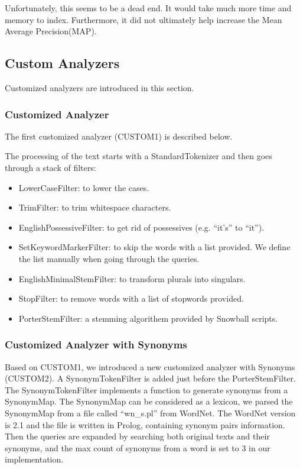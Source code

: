 Unfortunately, this seems to be a dead end. It would take much more time and memory to index. Furthermore, it did not ultimately help increase the Mean Average Precision(MAP).

\subsection{Custom Analyzers}

Customized analyzers are introduced in this section.

\subsubsection{Customized Analyzer}\hfill
\newline
The first customized analyzer (CUSTOM1) is described below.

The processing of the text starts with a StandardTokenizer and then goes through a stack of filters:

\begin{itemize}
    \item LowerCaseFilter: to lower the cases.
    \item TrimFilter: to trim whitespace characters.
    \item EnglishPossessiveFilter: to get rid of possessives (e.g. “it's” to “it”).
    \item SetKeywordMarkerFilter: to skip the words with a list provided. We define the list manually when going through the queries.
    \item EnglishMinimalStemFilter: to transform plurals into singulars.
    \item StopFilter: to remove words with a list of stopwords provided.
    \item PorterStemFilter: a stemming algorithem provided by Snowball scripts\cite{porterStemmer}.
\end{itemize}

\subsubsection{Customized Analyzer with Synonyms}\hfill
\newline
Based on CUSTOM1, we introduced a new customized analyzer with Synonyms (CUSTOM2). A SynonymTokenFilter is added just before the PorterStemFilter. The SynonymTokenFilter implements a function to generate synonyms from a SynonymMap. The SynonymMap can be considered as a lexicon, we parsed the SynonymMap from a file called “wn\_s.pl” from WordNet\cite{wordnet}. The WordNet version is 2.1 and the file is written in Prolog, containing synonym pairs information. Then the queries are expanded by searching both original texts and their synonyms, and the max count of synonyms from a word is set to 3 in our implementation.

